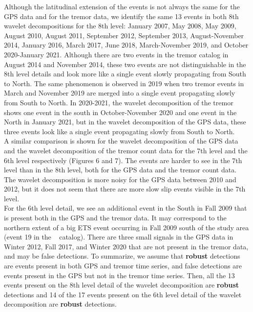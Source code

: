 \documentclass{article}
\begin{document}
Although the latitudinal extension of the events is not always the same for the GPS data and for the tremor data, we identify the same 13 events in both 8th wavelet decompositions for the 8th level: January 2007, May 2008, May 2009, August 2010, August 2011, September 2012, September 2013, August-November 2014, January 2016, March 2017, June 2018, March-November 2019, and October 2020-January 2021. Although there are two events in the tremor catalog in August 2014 and November 2014, these two events are not distinguishable in the 8th level details and look more like a single event slowly propagating from South to North. The same phenomenon is observed in 2019 when two tremor events in March and November 2019 are merged into a single event propagating slowly from South to North. In 2020-2021, the wavelet decomposition of the tremor shows one event in the south in October-November 2020 and one event in the North in January 2021, but in the wavelet decomposition of the GPS data, these three events look like a single event propagating slowly from South to North. \\

A similar comparison is shown for the wavelet decomposition of the GPS data and the wavelet decomposition of the tremor count data for the 7th level and the 6th level respectively (Figures 6 and 7). The events are harder to see in the 7th level than in the 8th level, both for the GPS data and the tremor count data. The wavelet decomposition is more noisy for the GPS data between 2010 and 2012, but it does not seem that there are more slow slip events visible in the 7th level. \\

For the 6th level detail, we see an additional event in the South in Fall 2009 that is present both in the GPS and the tremor data. It may correspond to the northern extent of a big ETS event occurring in Fall 2009 south of the study area (event 19 in the ~\citet{MIC_2019} catalog). There are three small signals in the GPS data in Winter 2012, Fall 2017, and Winter 2020 that are not present in the tremor data, and may be false detections. To summarize, we assume that \textbf{robust} detections are events present in both GPS and tremor time series, and false detections are events present in the GPS but not in the tremor time series. Then, all the 13 events present on the 8th level detail of the wavelet decomposition are \textbf{robust} detections and 14 of the 17 events present on the 6th level detail of the wavelet decomposition are \textbf{robust} detections. \\
\end{document}
